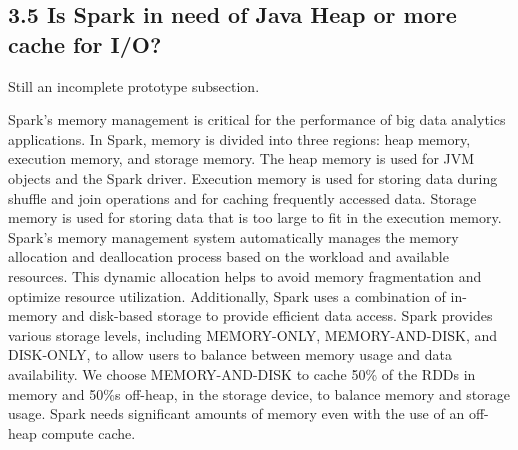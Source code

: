 \documentclass[twocolumn,10pt]{asme2e}
\begin{document}
\subsection*{3.5 Is Spark in need of Java Heap or more cache for I/O?}
Still an incomplete prototype subsection.

Spark's memory management is critical for the performance of big data analytics applications. In Spark, memory is divided into three regions: heap memory, execution memory, and storage memory. The heap memory is used for JVM objects and the Spark driver. Execution memory is used for storing data during shuffle and join operations and for caching frequently accessed data. Storage memory is used for storing data that is too large to fit in the execution memory. Spark's memory management system automatically manages the memory allocation and deallocation process based on the workload and available resources. This dynamic allocation helps to avoid memory fragmentation and optimize resource utilization. Additionally, Spark uses a combination of in-memory and disk-based storage to provide efficient data access. Spark provides various storage levels, including MEMORY-ONLY, MEMORY-AND-DISK, and DISK-ONLY, to allow users to balance between memory usage and data availability. We choose MEMORY-AND-DISK to cache 50\% of the RDDs in memory and 50\%s off-heap, in the storage device, to balance memory and storage usage. Spark needs significant amounts of memory even with the use of an off-heap compute cache.
\end{document}
